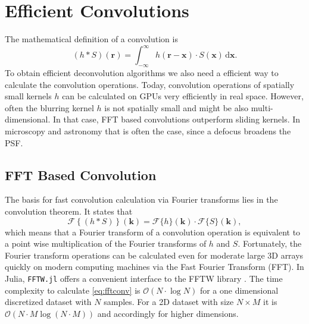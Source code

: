 \documentclass{juliacon}
\begin{document}
\section{Efficient Convolutions}
The mathematical definition of a convolution is
\begin{equation}
    (h * S)(\mathbf r) = \int_{-\infty}^{\infty} h(\mathbf r - \mathbf x) \cdot S(\mathbf x) \, \mathrm d \mathbf x.
    \label{eq:conv}
\end{equation}
To obtain efficient deconvolution algorithms we also need a efficient way to calculate the convolution operations.
Today, convolution operations of spatially small kernels $h$ can be calculated on GPUs very efficiently in real space.
However, often the blurring kernel $h$ is not spatially small and might be also multi-dimensional. In that case, FFT based convolutions
outperform sliding kernels. In microscopy and astronomy that is often the case, since a defocus broadens the PSF.

\subsection{FFT Based Convolution}
    The basis for fast convolution calculation via Fourier transforms lies in the convolution theorem. It states that
    \begin{equation}
        \mathcal F\left\{(h * S)\right\}(\mathbf k) = \mathcal F\{h\} (\mathbf k) \cdot \mathcal F\{S\} (\mathbf k),
        \label{eq:fftconv}
    \end{equation} 
        which means that a Fourier transform of a  convolution operation is equivalent to a point wise multiplication of the Fourier transforms 
        of $h$ and $S$.
        Fortunately, the Fourier transform operations can be calculated even for moderate large 3D arrays quickly on modern computing machines via
        the Fast Fourier Transform (FFT).
        In Julia, \verb|FFTW.jl| offers a convenient interface to the FFTW library \cite{FFTW05}.
        The time complexity to calculate \autoref{eq:fftconv} is $\mathcal{O}(N \cdot \log N)$ for a one dimensional discretized dataset with $N$ samples.
        For a 2D dataset with size $N \times M$ it is $\mathcal{O}(N \cdot M \log(N \cdot M))$ and accordingly for higher dimensions.
\end{document}
